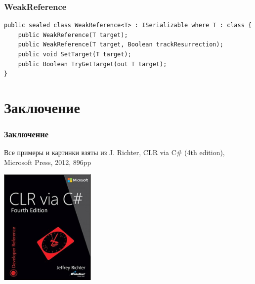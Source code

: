 \documentclass[xetex,mathserif,serif]{beamer}
\begin{document}
	\begin{frame}[fragile]
		\frametitle{WeakReference}
		\begin{scriptsize}
			\begin{verbatim}
public sealed class WeakReference<T> : ISerializable where T : class {
    public WeakReference(T target);
    public WeakReference(T target, Boolean trackResurrection);
    public void SetTarget(T target);
    public Boolean TryGetTarget(out T target);
}
			\end{verbatim}
		\end{scriptsize}
	\end{frame}

	\section{Заключение}

	\begin{frame}
		\frametitle{Заключение}
		Все примеры и картинки взяты из J. Richter, CLR via C\# (4th edition), Microsoft Press, 2012, 896pp
		\begin{center}
			\includegraphics[width=0.35\textwidth]{richterCover.png}
		\end{center}
	\end{frame}
\end{document}
